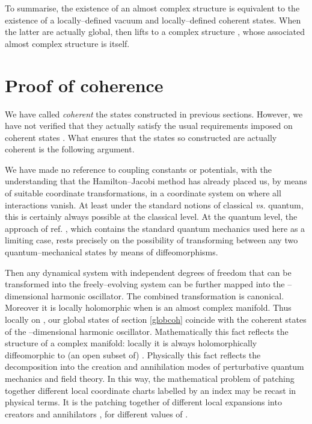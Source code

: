 \documentclass[a4paper,a4paper]{article}
\begin{document}
To summarise, the existence of an almost complex structure \coordHE{} 
is equivalent to the existence of a locally--defined vacuum and
locally--defined coherent states. When the latter are actually global, then
\coordHE{} lifts to a complex structure \coordHE{}, whose 
associated almost complex structure is \coordHE{} itself.

\section{Proof of coherence}\label{prov}

We have called {\it coherent} the states constructed in previous sections.
However, we have not verified that they actually satisfy the usual requirements 
imposed on coherent states \cite{COHST}. What ensures that the states so 
constructed are actually coherent is the following argument. 

We have made no reference to coupling constants or potentials, with the understanding 
that the Hamilton--Jacobi method has already placed us, by means of suitable coordinate 
transformations, in a coordinate system on \coordHE{} where all interactions vanish. 
At least under the standard notions of classical {\it vs.} quantum, this is certainly 
always possible at the classical level. At the quantum level, the approach of 
ref. \cite{MATONE}, which contains the standard quantum mechanics used here
as a limiting case, rests precisely on the possibility of transforming between any 
two quantum--mechanical states by means of diffeomorphisms. 

Then any dynamical system with \coordHE{} independent degrees of freedom that can be transformed 
into the freely--evolving system can be further mapped into the \coordHE{}--dimensional harmonic 
oscillator. The combined transformation is canonical. Moreover it is locally holomorphic when 
\coordHE{} is an almost complex manifold. Thus locally on \coordHE{}, our global states 
\coordHE{} of section \ref{globcoh} coincide with the coherent states of the 
\coordHE{}--dimensional harmonic oscillator. Mathematically this fact reflects the structure 
of a complex manifold: locally it is always holomorphically diffeomorphic to 
(an open subset of) \coordHE{}. Physically this fact reflects 
the decomposition into the creation and annihilation modes of perturbative quantum 
mechanics and field theory. In this way, the mathematical problem of patching together different 
local coordinate charts \coordHE{} labelled by an index 
\myHighlight{$\alpha$}\coordHE{} may be recast in physical terms. It is the patching together of different 
local expansions into creators \coordHE{} and annihilators \coordHE{}, 
for different values of \myHighlight{$\alpha$}\coordHE{}.
\end{document}
